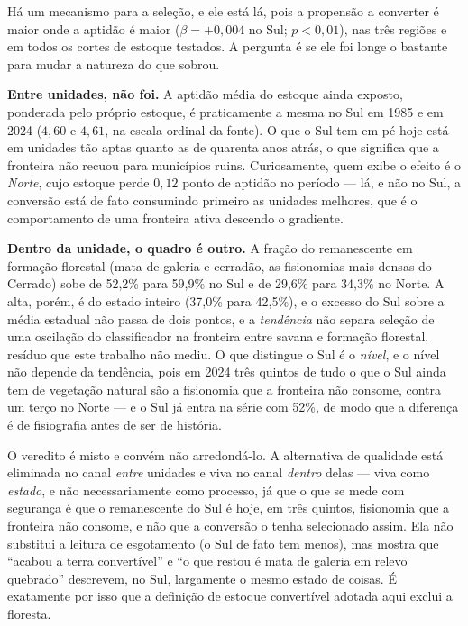 Há um mecanismo para a seleção, e ele está lá, pois a propensão a converter é maior
onde a aptidão é maior ($\beta = +0{,}004$ no Sul; $p < 0{,}01$), nas três
regiões e em todos os cortes de estoque testados. A pergunta é se ele foi longe
o bastante para mudar a natureza do que sobrou.

\textbf{Entre unidades, não foi.} A aptidão média do estoque ainda exposto,
ponderada pelo próprio estoque, é praticamente a mesma no Sul em 1985 e em 2024
($4{,}60$ e $4{,}61$, na escala ordinal da fonte). O que o Sul tem em pé
hoje está em unidades tão aptas quanto as de quarenta anos atrás, o que significa que a fronteira
não recuou para municípios ruins. Curiosamente, quem exibe o efeito é o
\emph{Norte}, cujo estoque perde $0{,}12$ ponto de aptidão no período --- lá, e
não no Sul, a conversão está de fato consumindo primeiro as unidades melhores,
que é o comportamento de uma fronteira ativa descendo o gradiente.

\textbf{Dentro da unidade, o quadro é outro.} A fração do remanescente em
formação florestal (mata de galeria e cerradão, as fisionomias mais densas do
Cerrado) sobe de 52,2\% para 59,9\% no Sul e de 29,6\% para
34,3\% no Norte. A alta, porém, é do estado inteiro (37,0\% para 42,5\%), e o
excesso do Sul sobre a média estadual não passa de dois pontos, e a
\emph{tendência} não separa seleção de uma oscilação do classificador na fronteira
entre savana e formação florestal, resíduo que este trabalho não mediu. O que
distingue o Sul é o \emph{nível}, e o nível não depende da tendência, pois em 2024
três quintos de tudo o que o Sul ainda tem de vegetação natural são a fisionomia
que a fronteira não consome, contra um terço no Norte --- e o Sul já entra na
série com 52\%, de modo que a diferença é de fisiografia antes de ser de
história.

O veredito é misto e convém não arredondá-lo. A alternativa de qualidade está
eliminada no canal \emph{entre} unidades e viva no canal \emph{dentro} delas ---
viva como \emph{estado}, e não necessariamente como processo, já que o que se mede com
segurança é que o remanescente do Sul é hoje, em três quintos, fisionomia que a
fronteira não consome, e não que a conversão o tenha selecionado assim.
Ela não substitui a leitura de esgotamento (o Sul de fato tem menos), mas
mostra que ``acabou a terra convertível'' e ``o que restou é mata de galeria em
relevo quebrado'' descrevem, no Sul, largamente o mesmo estado de coisas. É
exatamente por isso que a definição de estoque convertível adotada aqui exclui
a floresta.

